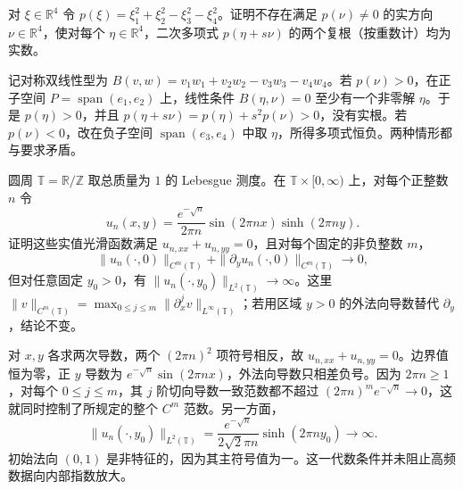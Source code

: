 \begin{exercise}\label{b2:ex:08-no-time-ultra}
对 \(\xi\in\mathbb R^4\) 令 \(p(\xi)=\xi_1^2+\xi_2^2-\xi_3^2-\xi_4^2\)。证明不存在满足 \(p(\nu)\ne0\) 的实方向 \(\nu\in\mathbb R^4\)，使对每个 \(\eta\in\mathbb R^4\)，二次多项式 \(p(\eta+s\nu)\) 的两个复根（按重数计）均为实数。
\end{exercise}
\begin{solution}
记对称双线性型为 \(B(v,w)=v_1w_1+v_2w_2-v_3w_3-v_4w_4\)。若 \(p(\nu)>0\)，在正子空间 \(P=\operatorname{span}(e_1,e_2)\) 上，线性条件 \(B(\eta,\nu)=0\) 至少有一个非零解 \(\eta\)。于是 \(p(\eta)>0\)，并且
\(p(\eta+s\nu)=p(\eta)+s^2p(\nu)>0\)，没有实根。若 \(p(\nu)<0\)，改在负子空间 \(\operatorname{span}(e_3,e_4)\) 中取 \(\eta\)，所得多项式恒负。两种情形都与要求矛盾。
\end{solution}

\begin{exercise}\label{b2:ex:08-elliptic-cauchy-instability}
圆周 \(\mathbb T=\mathbb R/\mathbb Z\) 取总质量为 \(1\) 的 Lebesgue 测度。在 \(\mathbb T\times[0,\infty)\) 上，对每个正整数 \(n\) 令
\[
 u_n(x,y)=\frac{e^{-\sqrt n}}{2\pi n}\sin(2\pi n x)\sinh(2\pi n y).
\]
证明这些实值光滑函数满足 \(u_{n,xx}+u_{n,yy}=0\)，且对每个固定的非负整数 \(m\)，
\[
 \|u_n(\cdot,0)\|_{C^m(\mathbb T)}
 +\|\partial_yu_n(\cdot,0)\|_{C^m(\mathbb T)}\longrightarrow0,
\]
但对任意固定 \(y_0>0\)，有 \(\|u_n(\cdot,y_0)\|_{L^2(\mathbb T)}\to\infty\)。这里
\(\|v\|_{C^m(\mathbb T)}=\max_{0\leq j\leq m}\|\partial_x^jv\|_{L^\infty(\mathbb T)}\)；若用区域 \(y>0\) 的外法向导数替代 \(\partial_y\)，结论不变。
\end{exercise}
\begin{solution}
对 \(x,y\) 各求两次导数，两个 \((2\pi n)^2\) 项符号相反，故 \(u_{n,xx}+u_{n,yy}=0\)。边界值恒为零，正 \(y\) 导数为 \(e^{-\sqrt n}\sin(2\pi n x)\)，外法向导数只相差负号。因为 \(2\pi n\geq1\)，对每个 \(0\leq j\leq m\)，其 \(j\) 阶切向导数一致范数都不超过 \((2\pi n)^m e^{-\sqrt n}\to0\)，这就同时控制了所规定的整个 \(C^m\) 范数。另一方面，
\[
 \|u_n(\cdot,y_0)\|_{L^2(\mathbb T)}
 =\frac{e^{-\sqrt n}}{2\sqrt2\pi n}\sinh(2\pi n y_0)\longrightarrow\infty.
\]
初始法向 \((0,1)\) 是非特征的，因为其主符号值为一。这一代数条件并未阻止高频数据向内部指数放大。
\end{solution}

